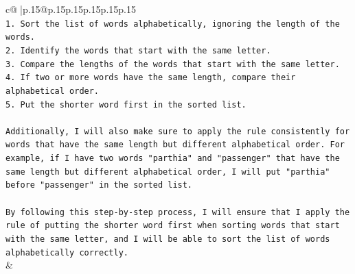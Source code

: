 \documentclass{article}
\begin{document}
{\begin{supertabular}{c@{$\;$}|p{.15\linewidth}@{}p{.15\linewidth}p{.15\linewidth}p{.15\linewidth}p{.15\linewidth}p{.15\linewidth}}
{{{\\ 
\texttt{1. Sort the list of words alphabetically, ignoring the length of the words.} \\
\texttt{2. Identify the words that start with the same letter.} \\
\texttt{3. Compare the lengths of the words that start with the same letter.} \\
\texttt{4. If two or more words have the same length, compare their alphabetical order.} \\
\texttt{5. Put the shorter word first in the sorted list.} \\
\\ 
\texttt{Additionally, I will also make sure to apply the rule consistently for words that have the same length but different alphabetical order. For example, if I have two words "parthia" and "passenger" that have the same length but different alphabetical order, I will put "parthia" before "passenger" in the sorted list.} \\
\\ 
\texttt{By following this step{-}by{-}step process, I will ensure that I apply the rule of putting the shorter word first when sorting words that start with the same letter, and I will be able to sort the list of words alphabetically correctly.} \\
            }
        }
    }
    & \\ \\

\end{supertabular}
}
\end{document}
